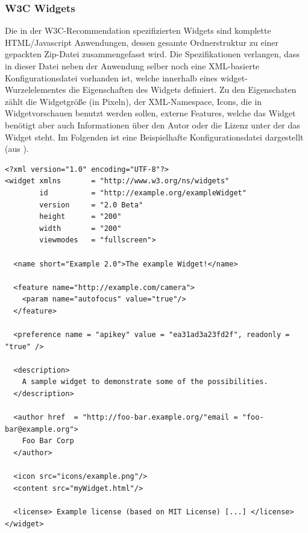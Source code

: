 \subsubsection{W3C Widgets}\label{section:w3c_widgets}
Die in der W3C-Recommendation spezifizierten Widgets \cite{W3C-11-2012}  sind komplette HTML/Javascript Anwendungen, dessen gesamte Ordnerstruktur zu einer gepackten Zip-Datei zusammengefasst wird. Die Spezifikationen verlangen, dass in dieser Datei neben der Anwendung selber noch eine XML-basierte Konfigurationsdatei vorhanden ist, welche innerhalb eines widget-Wurzelelementes die Eigenschaften des Widgets definiert. Zu den Eigenschaten zählt die Widgetgröße (in Pixeln), der XML-Namespace, Icons, die in Widgetvorschauen benutzt werden sollen, externe Features, welche das Widget benötigt aber auch Informationen über den Autor oder die Lizenz unter der das Widget steht. Im Folgenden ist eine Beispielhafte Konfigurationsdatei dargestellt (aus \cite{W3C-11-2012}).
\begin{lstlisting}
<?xml version="1.0" encoding="UTF-8"?>
<widget xmlns       = "http://www.w3.org/ns/widgets"
        id          = "http://example.org/exampleWidget"
        version     = "2.0 Beta"
        height      = "200"
        width       = "200"
        viewmodes   = "fullscreen">
 
  <name short="Example 2.0">The example Widget!</name>

  <feature name="http://example.com/camera">
    <param name="autofocus" value="true"/>
  </feature>

  <preference name = "apikey" value = "ea31ad3a23fd2f", readonly = "true" />

  <description>
    A sample widget to demonstrate some of the possibilities.
  </description>

  <author href  = "http://foo-bar.example.org/"email = "foo-bar@example.org">
    Foo Bar Corp
  </author>

  <icon src="icons/example.png"/>
  <content src="myWidget.html"/>
  
  <license> Example license (based on MIT License) [...] </license>
</widget>
\end{lstlisting}

